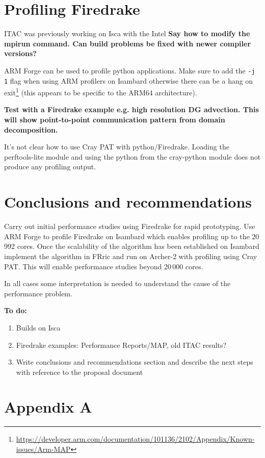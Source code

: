 \documentclass[a4paper,titlepage]{article}
\begin{document}

\section{Profiling Firedrake}
\label{section:profiling_firedrake}

ITAC was previously working on Isca with the Intel \textbf{Say how to modify the mpirun command. Can build problems be fixed with newer compiler versions?}

ARM Forge can be used to profile python applications. Make sure to add the \verb+-j 1+ flag when using ARM profilers on Isambard otherwise there can be a hang on exit\footnote{\url{https://developer.arm.com/documentation/101136/2102/Appendix/Known-issues/Arm-MAP}} (this appears to be specific to the ARM64 architecture).

\textbf{Test with a Firedrake example e.g. high resolution DG advection. This will show point-to-point communication pattern from domain decomposition.}

It's not clear how to use Cray PAT with python/Firedrake. Loading the perftools-lite module and using the python from the cray-python module does not produce any profiling output.


\section{Conclusions and recommendations}
\label{section:conclusions}

Carry out initial performance studies using Firedrake for rapid prototyping. Use ARM Forge to profile Firedrake on Isambard which enables profiling up to the 20\,992 cores. Once the scalability of the algorithm has been established on Isambard implement the algorithm in FRric and run on Archer-2 with profiling using Cray PAT. This will enable performance studies beyond 20\,000 cores.

In all cases some interpretation is needed to understand the cause of the performance problem. 

\noindent
\textbf{To do:}

\begin{enumerate}
\item Builds on Isca
\item Firedrake examples: Performance Reports/MAP, old ITAC results?
\item Write conclusions and recommendations section and describe the next steps with reference to the proposal document
\end{enumerate}

\pagebreak


\section*{Appendix A}
\label{appendixA}

\end{document}
